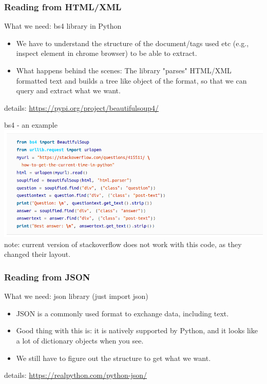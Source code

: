 \documentclass{beamer}
\begin{document}
\begin{frame}
\frametitle{Reading from HTML/XML}
What we need: bs4 library in Python
\begin{itemize}
\item We have to understand the structure of the document/tags used etc (e.g., inspect element in chrome browser) to be able to extract.
\item What happens behind the scenes: The library "parses" HTML/XML formatted text and builds a tree like object of the format, so that we can query and extract what we want. 
\end{itemize}
\tiny details: \url{https://pypi.org/project/beautifulsoup4/}
\end{frame}

\begin{frame}{bs4 - an example}
    \includegraphics[width=\textwidth]{figures/bs4example.png}
    \tiny note: current version of stackoverflow does not work with this code, as they changed their layout. 
\end{frame}

\begin{frame}
\frametitle{Reading from JSON}
What we need: json library (just import json)
\begin{itemize}
\item JSON is a commonly used format to exchange data, including text.
\item Good thing with this is: it is natively supported by Python, and it looks like a lot of dictionary objects when you see. 
\item We still have to figure out the structure to get what we want. 
\end{itemize}
\tiny details: \url{https://realpython.com/python-json/}
\end{frame}
\end{document}
